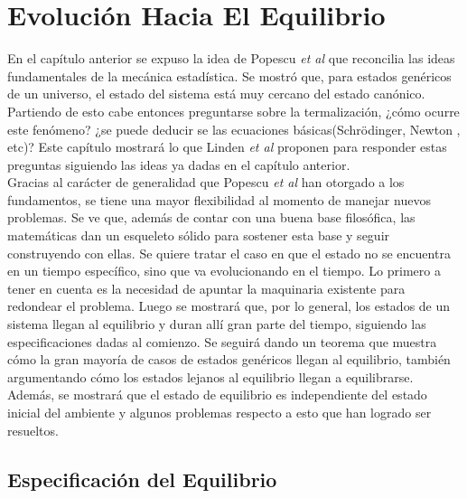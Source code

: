 \chapter{Evolución Hacia El Equilibrio}

En el capítulo anterior se expuso la idea de Popescu \textit{et al} \cite{Popescu2006} que reconcilia las ideas fundamentales de la mecánica estadística. Se mostró que, para estados genéricos de un universo, el estado del sistema está muy cercano del estado canónico. Partiendo de esto cabe entonces preguntarse sobre la termalización, ¿cómo ocurre este fenómeno? ¿se puede deducir se las ecuaciones básicas(Schrödinger, Newton , etc)? Este capítulo mostrará lo que Linden \textit{et al} \cite{LindenPaper} proponen para responder estas preguntas siguiendo las ideas ya dadas en el capítulo anterior. 
\\
Gracias al carácter de generalidad que Popescu \textit{et al} han otorgado a los fundamentos, se tiene una mayor flexibilidad al momento de manejar nuevos problemas. Se ve que, además de contar con una buena base filosófica, las matemáticas dan un esqueleto sólido para sostener esta base y seguir construyendo con ellas. Se quiere tratar el caso en que el estado no se encuentra en un tiempo específico, sino que va evolucionando en el tiempo. Lo primero a tener en cuenta es la necesidad de apuntar la maquinaria existente para redondear el problema. Luego se mostrará que, por lo general, los estados de un sistema llegan al equilibrio y duran allí gran parte del tiempo, siguiendo las especificaciones dadas al comienzo. Se seguirá dando un teorema que muestra cómo la gran mayoría de casos de estados genéricos llegan al equilibrio, también argumentando cómo los estados lejanos al equilibrio llegan a equilibrarse. Además, se mostrará que el estado de equilibrio es independiente del estado inicial del ambiente y algunos problemas respecto a esto que han logrado ser resueltos.  

\section{Especificación del Equilibrio}

